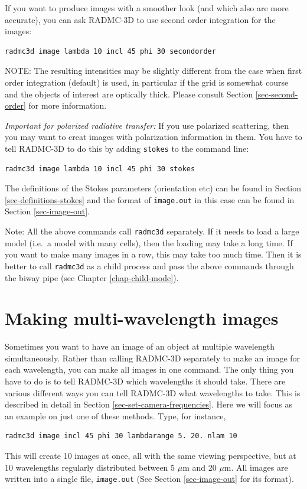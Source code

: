 \documentclass{report}
\newenvironment{asciibox}%
  {\begin{list}{}{%
    \setlength{\topsep}{0.5em}%
    \setlength{\parskip}{0em}%
    \setlength{\parsep}{0em}%
    \setlength{\itemsep}{0em}%
    \setlength{\rightmargin}{0em}%
    \setlength{\leftmargin}{3.0em}%
    \setlength{\labelsep}{1em}%
    \setlength{\labelwidth}{2em}%
  }\normalfont\footnotesize\item}
  {\end{list}}
\begin{document}
If you want to produce images with a smoother look (and which
also are more accurate), you can ask RADMC-3D to use second order 
integration for the images: 
\begin{asciibox}\begin{verbatim}
radmc3d image lambda 10 incl 45 phi 30 secondorder
\end{verbatim}\end{asciibox}
NOTE: The resulting intensities may be slightly different from the case
when first order integration (default) is used, in particular if the 
grid is somewhat course and the objects of interest are optically thick. 
Please consult Section \ref{sec-second-order} for more information.

{\em Important for polarized radiative transfer:} If you use polarized
scattering, then you may want to creat images with polarization 
information in them. You have to tell RADMC-3D to do this by adding
{\small\tt stokes} to the command line:
\begin{asciibox}\begin{verbatim}
radmc3d image lambda 10 incl 45 phi 30 stokes
\end{verbatim}\end{asciibox}
The definitions of the Stokes parameters (orientation etc) can be
found in Section \ref{sec-definitions-stokes} and the format of
{\small\tt image.out} in this case can be found in Section 
\ref{sec-image-out}.

Note: All the above commands call {\small\tt radmc3d} separately. If it
needs to load a large model (i.e.\ a model with many cells), then the 
loading may take a long time. If you want to make many images in a row,
this may take too much time. Then it is better to call {\small\tt radmc3d}
as a child process and pass the above commands through the biway pipe
(see Chapter \ref{chap-child-mode}).


\section{Making multi-wavelength images}
\label{sec-multi-wavelength-images}
%
Sometimes you want to have an image of an object at multiple wavelength
simultaneously. Rather than calling RADMC-3D separately to make an image for
each wavelength, you can make all images in one command. The only thing you
have to do is to tell RADMC-3D which wavelengths it should take. There are
various different ways you can tell RADMC-3D what wavelengths to take. This
is described in detail in Section \ref{sec-set-camera-frequencies}. Here
we will focus as an example on just one of these methods. Type, for instance,
\begin{asciibox}\begin{verbatim}
radmc3d image incl 45 phi 30 lambdarange 5. 20. nlam 10
\end{verbatim}\end{asciibox}
This will create 10 images at once, all with the same viewing perspective,
but at 10 wavelengths regularly distributed between 5 $\mu$m and 20 $\mu$m.
All images are written into a single file, {\small\tt image.out}
(See Section \ref{sec-image-out} for its format). 
\end{document}
